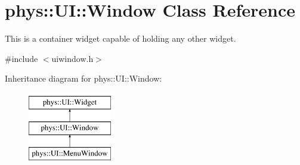 \hypertarget{classphys_1_1UI_1_1Window}{
\section{phys::UI::Window Class Reference}
\label{d4/d86/classphys_1_1UI_1_1Window}
}


This is a container widget capable of holding any other widget.  




{\ttfamily \#include $<$uiwindow.h$>$}

Inheritance diagram for phys::UI::Window:\begin{figure}[H]
\begin{center}
\leavevmode
\includegraphics[height=3.000000cm]{d4/d86/classphys_1_1UI_1_1Window}
\end{center}
\end{figure}
